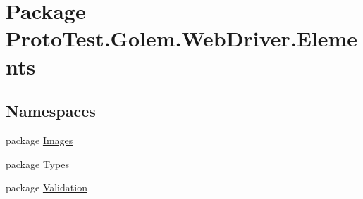 \hypertarget{namespace_proto_test_1_1_golem_1_1_web_driver_1_1_elements}{\section{Package Proto\-Test.\-Golem.\-Web\-Driver.\-Elements}
\label{namespace_proto_test_1_1_golem_1_1_web_driver_1_1_elements}
}
\subsection*{Namespaces}
\begin{DoxyCompactItemize}
\item 
package \hyperlink{namespace_proto_test_1_1_golem_1_1_web_driver_1_1_elements_1_1_images}{Images}
\item 
package \hyperlink{namespace_proto_test_1_1_golem_1_1_web_driver_1_1_elements_1_1_types}{Types}
\item 
package \hyperlink{namespace_proto_test_1_1_golem_1_1_web_driver_1_1_elements_1_1_validation}{Validation}
\end{DoxyCompactItemize}
